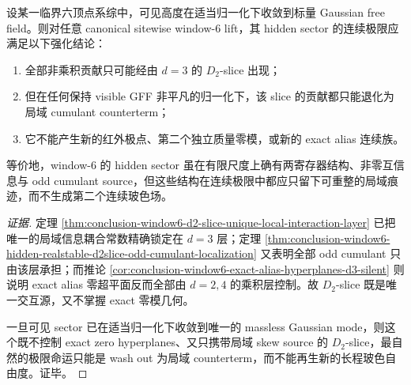 \begin{conjecture}\label{conj:conclusion-window6-d2-slice-washout-strengthened}
设某一临界六顶点系综中，可见高度在适当归一化下收敛到标量 Gaussian free field。则对任意 canonical sitewise window-\(6\) lift，其 hidden sector 的连续极限应满足以下强化结论：
\begin{enumerate}
  \item 全部非乘积贡献只可能经由 \(d=3\) 的 \(D_2\)-slice 出现；
  \item 但在任何保持 visible GFF 非平凡的归一化下，该 slice 的贡献都只能退化为局域 cumulant counterterm；
  \item 它不能产生新的红外极点、第二个独立质量零模，或新的 exact alias 连续族。
\end{enumerate}
等价地，window-\(6\) 的 hidden sector 虽在有限尺度上确有两寄存器结构、非零互信息与 odd cumulant source，但这些结构在连续极限中都应只留下可重整的局域痕迹，而不生成第二个连续玻色场。
\end{conjecture}
\begin{proof}[证据]
定理 \ref{thm:conclusion-window6-d2-slice-unique-local-interaction-layer} 已把唯一的局域信息耦合常数精确锁定在 \(d=3\) 层；定理 \ref{thm:conclusion-window6-hidden-realstable-d2slice-odd-cumulant-localization} 又表明全部 odd cumulant 只由该层承担；而推论 \ref{cor:conclusion-window6-exact-alias-hyperplanes-d3-silent} 则说明 exact alias 零超平面反而全部由 \(d=2,4\) 的乘积层控制。故 \(D_2\)-slice 既是唯一交互源，又不掌握 exact 零模几何。

一旦可见 sector 已在适当归一化下收敛到唯一的 massless Gaussian mode，则这个既不控制 exact zero hyperplanes、又只携带局域 skew source 的 \(D_2\)-slice，最自然的极限命运只能是 wash out 为局域 counterterm，而不能再生新的长程玻色自由度。证毕。
\end{proof}

\endinput
